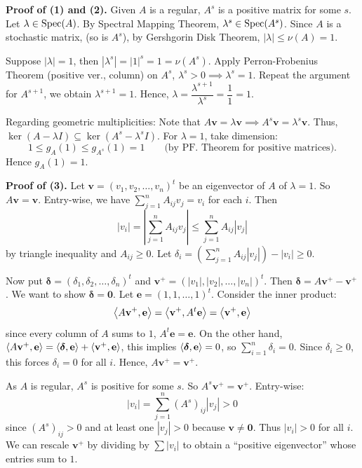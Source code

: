 \begin{pfbox}
\textbf{Proof of (1) and (2).}
Given $A$ is a regular, $A^s$ is a positive matrix for some $s$.
Let $\lambda\in\operatorname{Spec}(A)$. By Spectral Mapping Theorem, $\lambda^s\in\operatorname{Spec}(A^s)$.
Since $A$ is a stochastic matrix, (so is $A^s$), by Gershgorin Disk Theorem, $|\lambda|\le \nu(A)=1$.

Suppose $|\lambda|=1$, then $|\lambda^s|=|1|^s=1=\nu(A^s)$.
Apply Perron-Frobenius Theorem (positive ver., column) on $A^s$, $\lambda^s>0\implies \lambda^s=1$.
Repeat the argument for $A^{s+1}$, we obtain $\lambda^{s+1}=1$.
Hence, $\lambda=\dfrac{\lambda^{s+1}}{\lambda^s}=\dfrac{1}{1}=1$.

Regarding geometric multiplicities:
Note that $A\mathbf{v}=\lambda\mathbf{v}\implies A^s\mathbf{v}=\lambda^s\mathbf{v}$.
Thus, $\ker(A-\lambda I)\subseteq \ker(A^s-\lambda^s I)$.
For $\lambda=1$, take dimension:
\[
1
\le
 g_A(1)
\le
 g_{A^s}(1)
=
1
\qquad
\text{(by PF. Theorem for positive matrices)}.
\]
Hence $g_A(1)=1$.

\textbf{Proof of (3).}
Let $\mathbf{v}=(v_1,v_2,\dots,v_n)^t$ be an eigenvector of $A$ of $\lambda=1$.
So $A\mathbf{v}=\mathbf{v}$. Entry-wise, we have $\displaystyle\sum_{j=1}^n A_{ij}v_j=v_i$ for each $i$.
Then
\[
|v_i|
=
\left|\sum_{j=1}^n A_{ij}v_j\right|
\le
\sum_{j=1}^n A_{ij}|v_j|
\]
by triangle inequality and $A_{ij}\ge 0$.
Let $\delta_i=\left(\displaystyle\sum_{j=1}^n A_{ij}|v_j|\right)-|v_i|\ge 0$.

Now put $\boldsymbol{\delta}=(\delta_1,\delta_2,\dots,\delta_n)^t$ and $\mathbf{v}^+=(|v_1|,|v_2|,\dots,|v_n|)^t$.
Then $\boldsymbol{\delta}=A\mathbf{v}^+-\mathbf{v}^+$. We want to show $\boldsymbol{\delta}=\mathbf{0}$.
Let $\mathbf{e}=(1,1,\dots,1)^t$. Consider the inner product:
\[
\left\langle A\mathbf{v}^+, \mathbf{e} \right\rangle
=
\left\langle \mathbf{v}^+, A^t\mathbf{e} \right\rangle
=
\left\langle \mathbf{v}^+, \mathbf{e} \right\rangle
\]
since every column of $A$ sums to $1$, $A^t\mathbf{e}=\mathbf{e}$.
On the other hand, $\left\langle A\mathbf{v}^+, \mathbf{e} \right\rangle = \left\langle \boldsymbol{\delta}, \mathbf{e} \right\rangle + \left\langle \mathbf{v}^+, \mathbf{e} \right\rangle$,
this implies $\left\langle \boldsymbol{\delta}, \mathbf{e} \right\rangle=0$, so $\displaystyle\sum_{i=1}^n \delta_i=0$.
Since $\delta_i\ge 0$, this forces $\delta_i=0$ for all $i$.
Hence, $A\mathbf{v}^+=\mathbf{v}^+$.

As $A$ is regular, $A^s$ is positive for some $s$.
So $A^s\mathbf{v}^+=\mathbf{v}^+$. Entry-wise:
\[
|v_i|
=
\sum_{j=1}^n (A^s)_{ij}|v_j|
>
0
\]
since $(A^s)_{ij}>0$ and at least one $|v_j|>0$ because $\mathbf{v}\neq\mathbf{0}$.
Thus $|v_i|>0$ for all $i$. We can rescale $\mathbf{v}^+$ by dividing by $\displaystyle\sum |v_i|$ to obtain a ``positive eigenvector'' whose entries sum to $1$.



\end{pfbox}
